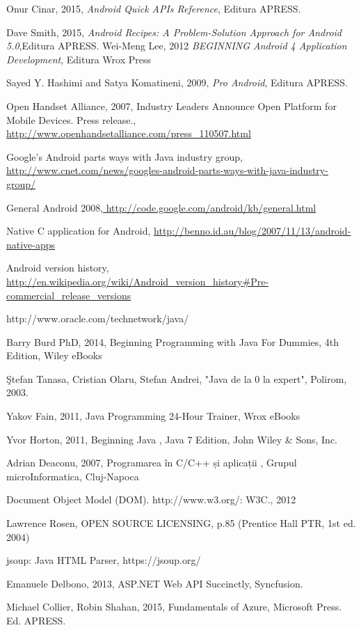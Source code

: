 
\begin{thebibliography}{99}


Onur Cinar, 2015, \emph{Android Quick APIs Reference}, Editura APRESS.

Dave Smith, 2015, \emph{Android Recipes: A Problem-Solution Approach for Android 5.0},Editura APRESS.
Wei-Meng Lee, 2012 \emph{BEGINNING Android 4 Application Development}, Editura Wrox Press

Sayed Y. Hashimi and Satya Komatineni, 2009, \emph{Pro Android},
Editura APRESS.

Open Handset Alliance, 2007, Industry Leaders Announce Open Platform for Mobile Devices. Press release., \newline\url{http://www.openhandsetalliance.com/press_110507.html}

Google's Android parts ways with Java industry group,\url{ http://www.cnet.com/news/googles-android-parts-ways-with-java-industry-group/}

General Android 2008,\newline\url{ http://code.google.com/android/kb/general.html}

Native C application for Android, \newline\url{http://benno.id.au/blog/2007/11/13/android-native-apps}

Android version history, \newline\url{http://en.wikipedia.org/wiki/Android_version_history#Pre-commercial_release_versions}

http://www.oracle.com/technetwork/java/

Barry Burd PhD, 2014, Beginning Programming with Java For Dummies, 4th Edition, Wiley eBooks

Ştefan Tanasa, Cristian Olaru, Stefan Andrei, "Java de la 0 la expert", Polirom, 2003.

Yakov Fain, 2011, Java Programming 24-Hour Trainer, Wrox eBooks

Yvor Horton, 2011, Beginning Java , Java 7 Edition, John Wiley \& Sons, Inc.

Adrian Deaconu, 2007, Programarea în C/C++ și aplicații , Grupul microInformatica, Cluj-Napoca

Document Object Model (DOM). http://www.w3.org/: W3C., 2012

Lawrence Rosen, OPEN SOURCE LICENSING, p.85 (Prentice Hall PTR, 1st ed. 2004)

jsoup: Java HTML Parser, https://jsoup.org/

Emanuele Delbono, 2013, ASP.NET Web API Succinctly, Syncfusion.

Michael Collier, Robin Shahan, 2015, Fundamentals of Azure, Microsoft Press. Ed. APRESS.

\end{thebibliography}

